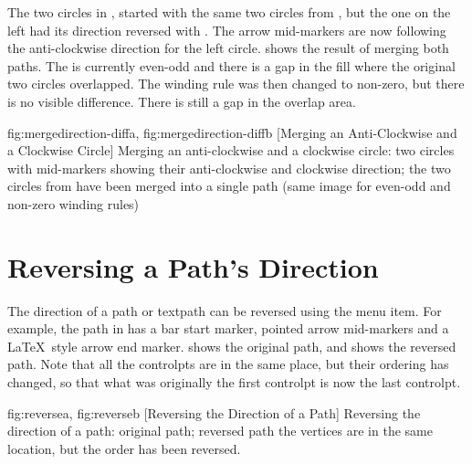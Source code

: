 The two circles in , started with
the same two circles from , but
the one on the left had its direction reversed with
. The arrow mid-markers are now following
the anti-clockwise direction for the left circle.
 shows the
result of merging both \glspl{path}. The  is currently
even-odd and there is a gap in the fill  where the
original two circles overlapped. The winding rule was then changed
to non-zero, but there is no visible difference. There is still a
gap in the overlap area.

{
  {fig:mergedirection-diffa}{}{},
  {fig:mergedirection-diffb}{}{}
}
[Merging an Anti-Clockwise and a Clockwise Circle]
{Merging an anti-clockwise and a clockwise circle:
 two circles with mid-markers
showing their anti-clockwise and clockwise direction;
 the two circles from 
 have been merged into a single
path (same image for even-odd and non-zero winding rules)}


\section{Reversing a Path's Direction}\label{sec:reversing}


The direction of a \gls{path} or \gls{textpath} can be reversed
using the  menu item. For example, the path
in  has a bar start marker, pointed arrow
mid-markers and a \LaTeX\ style arrow end marker.
 shows the original path, and
 shows the reversed path. Note that all the
\glspl{controlpt} are in the same place, but their ordering has
changed, so that what was originally the first \gls{controlpt} is
now the last \gls{controlpt}.

{
  {fig:reversea}{}{},
  {fig:reverseb}{}{}
}
[Reversing the Direction of a Path]
{Reversing the direction of a path:
 original path;
 reversed path\dash
the vertices are in the same location, but the order has been
reversed.}

